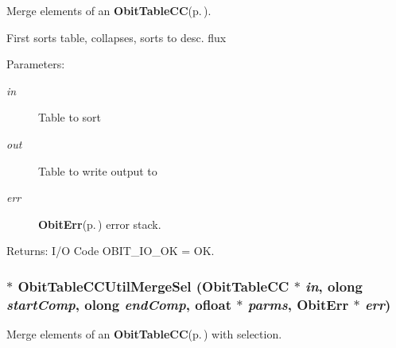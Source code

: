 Merge elements of an {\bf Obit\-Table\-CC}{\rm (p.\,\pageref{structObitTableCC})}. 

First sorts table, collapses, sorts to desc. flux \begin{Desc}
\item[Parameters:]
\begin{description}
\item[{\em in}]Table to sort \item[{\em out}]Table to write output to \item[{\em err}]{\bf Obit\-Err}{\rm (p.\,\pageref{structObitErr})} error stack. \end{description}
\end{Desc}
\begin{Desc}
\item[Returns:]I/O Code OBIT\_\-IO\_\-OK = OK. \end{Desc}
\subsubsection{$\ast$ Obit\-Table\-CCUtil\-Merge\-Sel ({\bf Obit\-Table\-CC} $\ast$ {\em in}, {\bf olong} {\em start\-Comp}, {\bf olong} {\em end\-Comp}, {\bf ofloat} $\ast$ {\em parms}, {\bf Obit\-Err} $\ast$ {\em err})}\label{ObitTableCCUtil_8h_a12}


Merge elements of an {\bf Obit\-Table\-CC}{\rm (p.\,\pageref{structObitTableCC})} with selection. 

